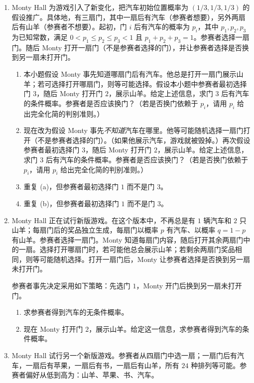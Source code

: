 \documentclass[UTF8,12pt,a4paper,fontset=fandol]{ctexart}
\begin{document}
\begin{enumerate}
  \item Monty Hall 为游戏引入了新变化，把汽车初始位置概率为 $(1/3,1/3,1/3)$ 的假设推广。具体地，有三扇门，其中一扇后有汽车（参赛者想要），另外两扇后有山羊（参赛者不想要）。起初，门 $i$ 后有汽车的概率为 $p_i$，其中 $p_1,p_2,p_3$ 为已知常数，满足 $0<p_1\le p_2\le p_3<1$ 且 $p_1+p_2+p_3=1$。参赛者选择一扇门。随后 Monty 打开一扇门（不是参赛者选择的门），并让参赛者选择是否换到另一扇未打开门。
  \begin{enumerate}
    \item 本小题假设 Monty 事先知道哪扇门后有汽车。他总是打开一扇门展示山羊；若可选择打开哪扇门，则等可能选择。假设本小题中参赛者最初选择门 $3$，随后 Monty 打开门 $2$，展示山羊。给定上述信息，求门 $3$ 后有汽车的条件概率。参赛者是否应该换门？（若是否换门依赖于 $p_i$，请用 $p_i$ 给出完全化简的判别准则。）
    \item 现在改为假设 Monty 事先\textit{不知道}汽车在哪里。他等可能随机选择一扇门打开（不是参赛者选择的门）。（如果他展示汽车，游戏就被毁掉。）再次假设参赛者最初选择门 $3$，随后 Monty 打开门 $2$，展示山羊。给定上述信息，求门 $3$ 后有汽车的条件概率。参赛者是否应该换门？（若是否换门依赖于 $p_i$，请用 $p_i$ 给出完全化简的判别准则。）
    \item 重复 (a)，但参赛者最初选择门 $1$ 而不是门 $3$。
    \item 重复 (b)，但参赛者最初选择门 $1$ 而不是门 $3$。
  \end{enumerate}

  \item Monty Hall 正在试行新版游戏。在这个版本中，不再总是有 $1$ 辆汽车和 $2$ 只山羊；每扇门后的奖品独立生成，每扇门以概率 $p$ 有汽车、以概率 $q=1-p$ 有山羊。参赛者选择一扇门。Monty 知道每扇门内容，随后打开其余两扇门中的一扇。选择打开哪扇门时，若可能他总会展示山羊；若剩余两扇门奖品相同，则等可能随机选择。打开一扇门后，Monty 让参赛者选择是否换到另一扇未打开门。

  参赛者事先决定采用如下策略：先选门 $1$，Monty 开门后换到另一扇未打开门。
  \begin{enumerate}
    \item 求参赛者得到汽车的无条件概率。
    \item 现在 Monty 打开门 $2$，展示山羊。给定这一信息，求参赛者得到汽车的条件概率。
  \end{enumerate}

  \item Monty Hall 试行另一个新版游戏。参赛者从四扇门中选一扇；一扇门后有汽车，一扇后有苹果，一扇后有书，一扇后有山羊，所有 $24$ 种排列等可能。参赛者偏好从低到高为：山羊、苹果、书、汽车。


\end{enumerate}
\end{document}
